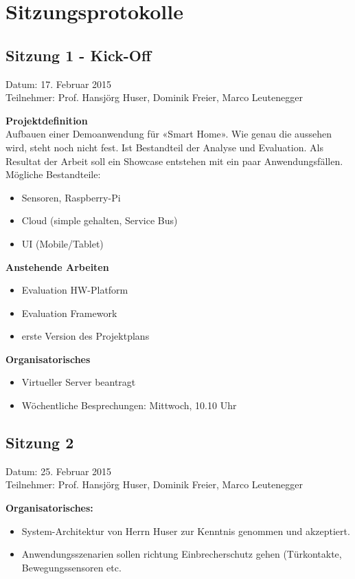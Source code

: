 \chapter{Sitzungsprotokolle}
\label{chap:Sitzungsprotokolle}
\section*{Sitzung 1 - Kick-Off}
	Datum: 17. Februar 2015 \\
	Teilnehmer: Prof. Hansjörg Huser, Dominik Freier, Marco Leutenegger

	\textbf{Projektdefinition} \\
	Aufbauen einer Demoanwendung für «Smart Home». Wie genau die aussehen wird, steht noch nicht fest. Ist Bestandteil der 
	Analyse und Evaluation. Als Resultat der Arbeit soll ein Showcase entstehen 	mit ein paar Anwendungsfällen. \\
	Mögliche Bestandteile:
	\begin{itemize}
		\item Sensoren, Raspberry-Pi
		\item Cloud (simple gehalten, Service Bus)
		\item UI (Mobile/Tablet)
	\end{itemize}

	\textbf{Anstehende Arbeiten}
	\begin{itemize}
		\item Evaluation HW-Platform
		\item Evaluation Framework
		\item erste Version des Projektplans
	\end{itemize}

	\textbf{Organisatorisches}
	\begin{itemize}
		\item Virtueller Server beantragt
		\item Wöchentliche Besprechungen: Mittwoch, 10.10 Uhr
	\end{itemize}

\section*{Sitzung 2}
	Datum: 25. Februar 2015 \\
	Teilnehmer: Prof. Hansjörg Huser, Dominik Freier, Marco Leutenegger

	\textbf{Organisatorisches:}
	\begin{itemize}
		\item System-Architektur von Herrn Huser zur Kenntnis genommen und akzeptiert.
		\item Anwendungsszenarien sollen richtung Einbrecherschutz gehen (Türkontakte, Bewegungssensoren etc.
	\end{itemize}

